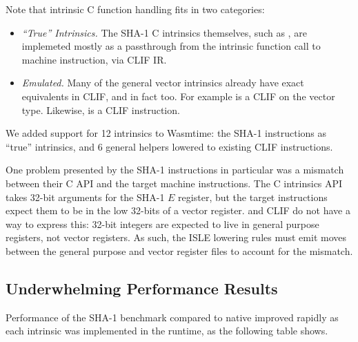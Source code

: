 Note that intrinsic C function handling fits in two categories:
\begin{itemize}
    \item \emph{``True'' Intrinsics.}
        The SHA-1 C intrinsics themselves, such as , are
        implemeted mostly as a passthrough from the intrinsic function call to
        machine instruction, via CLIF IR.
    \item \emph{Emulated.}
        Many of the general vector intrinsics already have exact equivalents in
        CLIF, and in fact \wasm too.  For example  is a CLIF
         on the vector  type.  Likewise,
         is a CLIF  instruction.
\end{itemize}

We added support for 12 intrinsics to Wasmtime: the SHA-1 instructions as
``true'' intrinsics, and 6 general helpers lowered to existing CLIF
instructions.

One problem presented by the SHA-1 instructions in particular was a mismatch
between their C API and the target machine instructions.  The C intrinsics API
takes 32-bit arguments for the SHA-1 $E$ register, but the target instructions
expect them to be in the low 32-bits of a vector register. \wasm and CLIF do not
have a way to express this: 32-bit integers are expected to live in general
purpose registers, not vector registers. As such, the ISLE lowering rules must
emit moves between the general purpose and vector register files to account for
the mismatch.

\subsection{Underwhelming Performance Results}
\label{sec:interimresults}

Performance of the SHA-1 benchmark compared to native improved rapidly as each
intrinsic was implemented in the runtime, as the following table shows.

\newcommand{\changeshaonec}{Intrinsic: \code{vsha1cq\_u32}}
\newcommand{\changeshaonepm}{Intrinsics: \code{vsha1\{p,m\}q\_u32}}
\newcommand{\changeshaoneh}{Intrinsic: \code{vsha1h\_u32}}
\newcommand{\changeshaonesuzero}{Intrinsic: \code{vsha1su0q\_u32}}
\newcommand{\changeshaonesuone}{Intrinsic: \code{vsha1su1q\_u32}}
\newcommand{\changevaddqu}{Intrinsic: \code{vaddq\_u32}}
\newcommand{\changevdupqnu}{Intrinsic: \code{vdupq\_n\_u32}}
\newcommand{\changevgetqlaneu}{Intrinsic: \code{vgetq\_lane\_u32}}
\newcommand{\changevreinterpretq}{Intrinsics: \code{vreinterpretq\_\{u32\_u8,u8\_u32\}}}
\newcommand{\changevrevqu}{Intrinsic: \code{vrev32q\_u8}}

